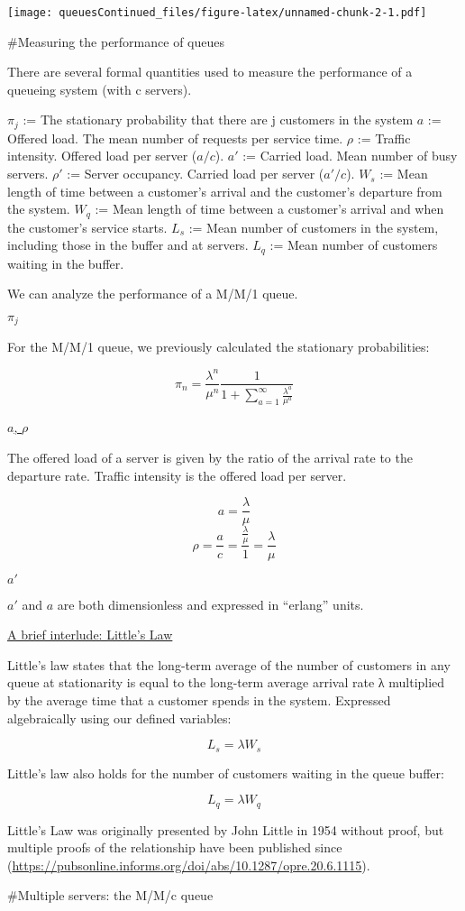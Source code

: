 \documentclass[]{article}
\begin{document}
\texttt{[image: queuesContinued\_files/figure-latex/unnamed-chunk-2-1.pdf]}

\#Measuring the performance of queues

There are several formal quantities used to measure the performance of a
queueing system (with c servers).

\begin{outline}[enumerate]
   \1 $\pi_j$ := The stationary probability that there are j customers in the system
   \1 $a$ := Offered load. The mean number of requests per service time.
   \1 $\rho$ := Traffic intensity. Offered load per server ($a/c$).
   \1 $a'$ := Carried load. Mean number of busy servers.
   \1 $\rho'$ := Server occupancy. Carried load per server ($a'/c$).
   \1 $W_s$ := Mean length of time between a customer's arrival and the customer's departure from the system.
   \1 $W_q$ := Mean length of time between a customer's arrival and when the customer's service starts.
   \1 $L_s$ := Mean number of customers in the system, including those in the buffer and at servers.
   \1 $L_q$ := Mean number of customers waiting in the buffer.
\end{outline}

We can analyze the performance of a M/M/1 queue.

\underline{$\pi_j$}

For the M/M/1 queue, we previously calculated the stationary
probabilities:

\[\pi_n = \frac{\lambda^n}{\mu^n}\frac{1}{1+\sum\limits_{a=1}^{\infty} \frac{\lambda ^a}{\mu ^a}}\]

\underline{$a$, $\rho$}

The offered load of a server is given by the ratio of the arrival rate
to the departure rate. Traffic intensity is the offered load per server.

\[a = \frac{\lambda}{\mu}\]
\[\rho = \frac{a}{c} = \frac{\frac{\lambda}{\mu}}{1} = \frac{\lambda}{\mu}\]

\underline{$a'$}

\(a'\) and \(a\) are both dimensionless and expressed in ``erlang''
units.

\underline{A brief interlude: Little's Law}

Little's law states that the long-term average of the number of
customers in any queue at stationarity is equal to the long-term average
arrival rate λ multiplied by the average time that a customer spends in
the system. Expressed algebraically using our defined variables:

\[L_s = \lambda W_s\]

Little's law also holds for the number of customers waiting in the queue
buffer:

\[L_q = \lambda W_q\]

Little's Law was originally presented by John Little in 1954 without
proof, but multiple proofs of the relationship have been published since
(\url{https://pubsonline.informs.org/doi/abs/10.1287/opre.20.6.1115}).

\#Multiple servers: the M/M/c queue
\end{document}
